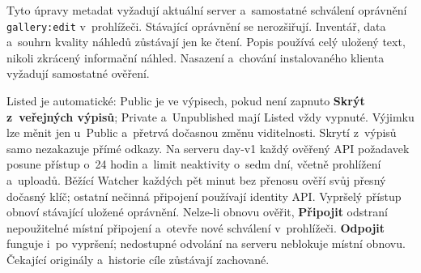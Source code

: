 \documentclass[11pt,a4paper]{article}
\newcommand{\ui}[1]{\textbf{#1}}
\begin{document}
Tyto úpravy metadat vyžadují aktuální server a~samostatné schválení oprávnění
\texttt{gallery:edit} v~prohlížeči. Stávající oprávnění se nerozšiřují. Inventář,
data a~souhrn kvality náhledů zůstávají jen ke čtení. Popis používá celý uložený
text, nikoli zkrácený informační náhled. Nasazení a~chování instalovaného klienta
vyžadují samostatné ověření.

Listed je automatické: Public je ve výpisech, pokud není zapnuto
\ui{Skrýt z~veřejných výpisů}; Private a~Unpublished mají Listed vždy vypnuté.
Výjimku lze měnit jen u~Public a~přetrvá dočasnou změnu viditelnosti.
Skrytí z~výpisů samo nezakazuje přímé odkazy.
Na serveru day-v1 každý ověřený API požadavek posune přístup o~24 hodin
a~limit neaktivity o~sedm dní, včetně prohlížení a~uploadů.
Běžící Watcher každých pět minut bez přenosu ověří svůj přesný dočasný klíč;
ostatní nečinná připojení používají identity API. Vypršelý přístup obnoví
stávající uložené oprávnění. Nelze-li obnovu ověřit, \ui{Připojit} odstraní
nepoužitelné místní připojení a~otevře nové schválení v~prohlížeči.
\ui{Odpojit} funguje i~po vypršení; nedostupné odvolání na serveru neblokuje
místní obnovu. Čekající originály a~historie cíle zůstávají zachované.
\end{document}
